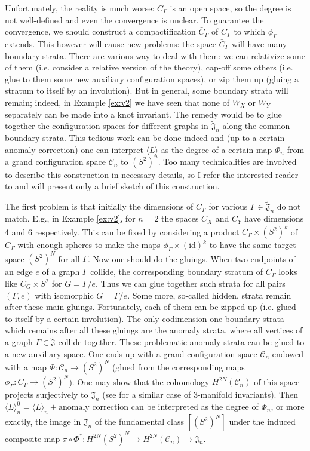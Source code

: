 \documentclass[10pt]{amsart}
\theoremstyle{definition}
\theoremstyle{remark}
\newcommand{\bJ}{\widetilde{\mathfrak{J}}}
\newcommand{\J}{\mathfrak{J}}
\def\<{\langle}
\def\>{\rangle}
\newcommand{\bC}{\bar{C}}
\newcommand{\cC}{\mathcal{C}}
\newcommand{\GG}{\Gamma}
\begin{document}
Unfortunately, the reality is much worse: $C_\GG$ is an open
space, so the degree is not well-defined and even the convergence
is unclear. To guarantee the convergence, we should construct a
compactification $\bC_\GG$ of $C_\GG$ to which $\phi_\GG$ extends.
This however will cause new problems: the space $\bC_\GG$ will
have many boundary strata. There are various way to deal
with them: we can relativize some of them (i.e. consider a
relative version of the theory), cap-off some others (i.e.
glue to them some new auxiliary configuration spaces), or
zip them up (gluing a stratum to itself by an involution).
But in general, some boundary strata will remain; indeed, in Example
\ref{ex:v2} we have seen that none of $W_X$ or $W_Y$ separately
can be made into a knot invariant. The remedy would be to glue
together the configuration spaces for different graphs in
$\bJ_n$ along the common boundary strata. This tedious work
can be done indeed \cite{Poi, T} and (up to a certain anomaly
correction) one can interpret $\<L\>$ as the degree of a certain
map $\Phi_n$ from a grand configuration space $\cC_n$ to $(S^2)^n$.
Too many technicalities are involved to describe this construction
in necessary details, so I refer the interested reader to
\cite{Poi, T} and will present only a brief sketch of this
construction.

The first problem is that initially the dimensions of $C_\GG$ for
various $\GG\in\bJ_n$ do not match. E.g., in Example \ref{ex:v2},
for $n=2$ the spaces $C_X$ and $C_Y$ have dimensions 4 and 6
respectively.
This can be fixed by considering a product $C_\GG\times(S^2)^k$
of $C_\GG$ with enough spheres to make the maps $\phi_\GG\times
(\text{id})^k$ to have the same target space $(S^2)^N$ for all $\GG$.
Now one should do the gluings. When two endpoints of an edge $e$
of a graph $\GG$ collide, the corresponding boundary stratum of
$C_\GG$ looks like $C_G\times S^2$ for $G=\GG/e$.
Thus we can glue together such strata for all pairs $(\GG,e)$
with isomorphic $G=\GG/e$. Some more, so-called hidden, strata
remain after these main gluings. Fortunately, each of them
can be zipped-up (i.e. glued to itself by a certain involution).
The only codimension one boundary strata which remains
after all these gluings are the anomaly strata, where all vertices
of a graph $\GG\in\bJ$ collide together. These problematic anomaly
strata can be glued \cite{Poi} to a new auxiliary space. One ends
up with a grand configuration space $\cC_n$ endowed with a map
$\Phi:\cC_n\to (S^2)^N$ (glued from the corresponding maps
$\phi_\GG : \bC_\GG\rightarrow (S^2)^N$).
One may show that the cohomology $H^{2N}(\cC_n)$ of this space
projects surjectively to $\J_n$ (see \cite{KT} for a similar
case of 3-manifold invariants).
Then $\<L\>^0_n=\<L\>_n+\text{anomaly correction}$ can be
interpreted as the degree of $\Phi_n$, or more exactly, the
image in $\J_n$ of the fundamental class $[(S^2)^N]$ under
the induced composite map
$\pi\circ\Phi^*:H^{2N}(S^2)^N\to H^{2N}(\cC_n)\to\J_n$.
\end{document}

